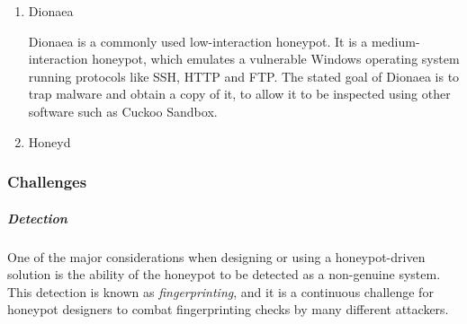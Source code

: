 {\begin{enumerate}
\begin{itemize}
		\item Cowrie fully emulates a Debian installsation, with an out-of-the-box configurable filesystem that an attacker can interact with.
		
		\item It is an open-source project, allowing users to adapt the honeypot to suit their specific needs.
		
		\item Cowrie records interactions between the attacker and the honeypot, logging everything from commands executed and file downloads attempted to the source IP addresses and protocol information.
		
		\item Cowrie does not limit the number of simultaneous sessions, and can present a mock filesystem and shell to each attacker independently.
		
		\item The fact that the Cowrie software doesn't call on any external sofware to operate makes it much less vulnerable to third-party compromises. It also improves substantially on its predecessor, Kippo, in that many of the fingerprinting issues are resolved.
	\end{itemize}

	Cowrie cannot execute malware, but can be used in conjunction with other solutions such as Cuckoo Sandbox {https://github.com/cuckoosandbox/cuckoo , accessed 24th March 2018} in order to execute and analyse malware safely in a controlled environment.
	
	\item Dionaea
	
	Dionaea is a commonly used low-interaction honeypot. It is a medium-interaction honeypot, which emulates a vulnerable Windows operating system running protocols like SSH, HTTP and FTP. The stated goal of Dionaea is to trap malware and obtain a copy of it, to allow it to be inspected using other software such as Cuckoo Sandbox.
	
	
	\item Honeyd 
	
\end{enumerate}

\subsubsection{Challenges}
	\subparagraph{Detection}
	One of the major considerations when designing or using a honeypot-driven solution is the ability of the honeypot to be detected as a non-genuine system. This detection is known as \textit{fingerprinting}, and it is a continuous challenge for honeypot designers to combat fingerprinting checks by many different attackers.
	
}
